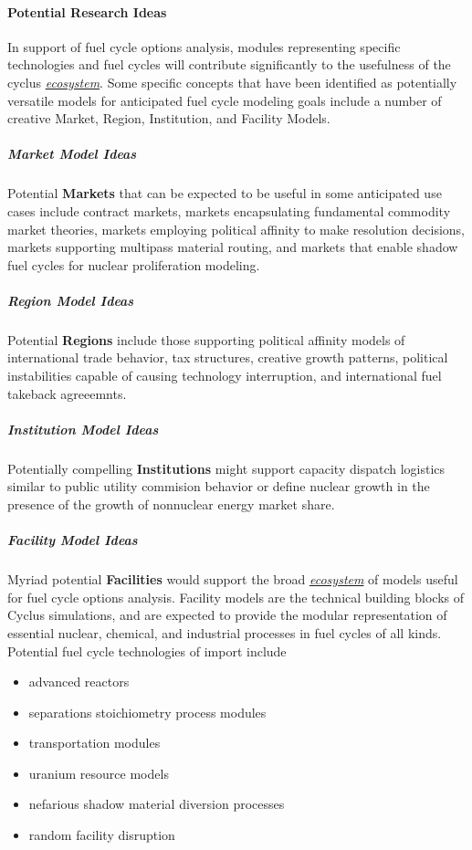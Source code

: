 \documentclass[letterpaper,10pt,english]{sphinxmanual}
\begin{document}
\paragraph{Potential Research Ideas}
\label{basics/roadmap:potential-research-ideas}
In support of fuel cycle options analysis, modules representing specific
technologies and fuel cycles will contribute significantly to the usefulness of
the cyclus {\hyperref[basics/ecosystem::doc]{\emph{ecosystem}}}. Some specific concepts that have been identified as
potentially versatile models for anticipated fuel cycle modeling goals include a
number of creative Market, Region, Institution, and Facility Models.


\subparagraph{Market Model Ideas}
\label{basics/roadmap:market-model-ideas}
Potential \textbf{Markets} that can be expected to be useful in some anticipated
use cases include contract markets, markets encapsulating fundamental commodity
market theories, markets employing political affinity to make resolution
decisions, markets supporting multipass material routing, and markets that
enable shadow fuel cycles for nuclear proliferation modeling.


\subparagraph{Region Model Ideas}
\label{basics/roadmap:region-model-ideas}
Potential \textbf{Regions} include those supporting political affinity models of
international trade behavior, tax structures, creative growth patterns, political
instabilities capable of causing technology interruption, and international fuel
takeback agreeemnts.


\subparagraph{Institution Model Ideas}
\label{basics/roadmap:institution-model-ideas}
Potentially compelling \textbf{Institutions} might support capacity dispatch logistics
similar to public utility commision behavior or define nuclear growth in the
presence of the growth of nonnuclear energy market share.


\subparagraph{Facility Model Ideas}
\label{basics/roadmap:facility-model-ideas}
Myriad potential \textbf{Facilities} would support the broad {\hyperref[basics/ecosystem::doc]{\emph{ecosystem}}}
of models useful for fuel cycle options analysis. Facility models are the
technical building blocks of Cyclus simulations, and are expected to provide the
modular representation of essential nuclear, chemical, and industrial processes
in fuel cycles of all kinds. Potential fuel cycle technologies of import include
\begin{itemize}
\item {} 
advanced reactors

\item {} 
separations stoichiometry process modules

\item {} 
transportation modules

\item {} 
uranium resource models

\item {} 
nefarious shadow material diversion processes

\item {} 
random facility disruption

\end{itemize}
\end{document}
